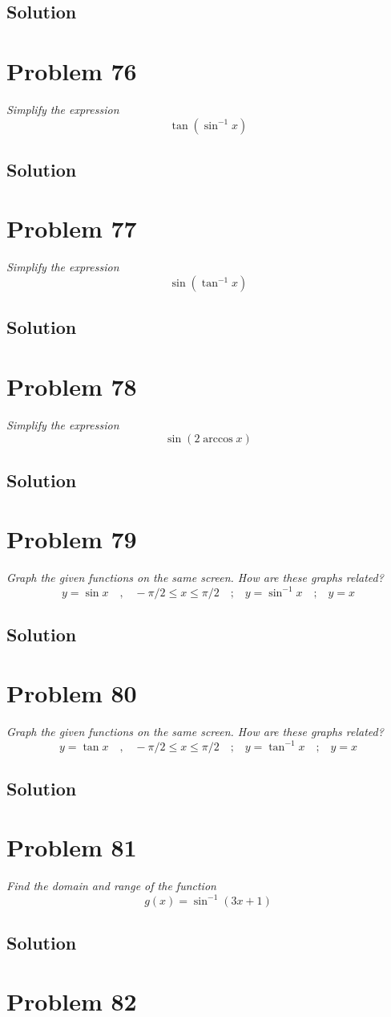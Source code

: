 \documentclass[11pt]{article}
\newcommand{\soln}{\subsection*}
\newcommand{\qn}{\textit}
\newcommand{\eqtext}[1]{\quad\text{#1}\quad}
\begin{document}
\soln{Solution}

\section*{Problem 76}

\qn{Simplify the expression $$\tan(\sin^{-1}x)$$}

\soln{Solution}

\section*{Problem 77}

\qn{Simplify the expression $$\sin(\tan^{-1}x)$$}

\soln{Solution}

\section*{Problem 78}

\qn{Simplify the expression $$\sin(2\arccos{x})$$}

\soln{Solution}

\section*{Problem 79}

\qn{Graph the given functions on the same screen. How are these graphs related? $$y=\sin{x} \eqtext{,} -\pi/2 \le x \le \pi/2 \eqtext{;} y=\sin^{-1}x \eqtext{;} y=x$$}
\soln{Solution}

\section*{Problem 80}

\qn{Graph the given functions on the same screen. How are these graphs related? $$y=\tan{x} \eqtext{,} -\pi/2 \le x \le \pi/2 \eqtext{;} y=\tan^{-1}x \eqtext{;} y=x$$}
\soln{Solution}

\section*{Problem 81}

\qn{Find the domain and range of the function $$g(x)=\sin^{-1}(3x+1)$$}

\soln{Solution}

\section*{Problem 82}
\end{document}
